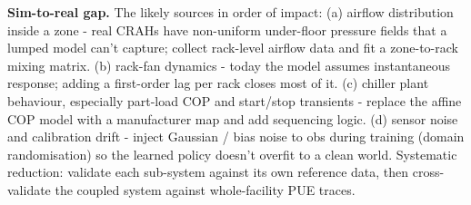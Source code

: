 \documentclass[letterpaper,11pt]{article}
\begin{document}
	\textbf{Sim-to-real gap.} The likely sources in order of impact: 
	(a) airflow distribution inside a zone - real CRAHs have non-uniform under-floor pressure fields that a lumped model can't capture; collect rack-level airflow data and fit a zone-to-rack mixing matrix. 
	(b) rack-fan dynamics - today the model assumes instantaneous response; adding a first-order lag per rack closes most of it. 
	(c) chiller plant behaviour, especially part-load COP and start/stop transients - replace the affine COP model with a manufacturer map and add sequencing logic. 
	(d) sensor noise and calibration drift - inject Gaussian / bias noise to obs during training (domain randomisation) so the learned policy doesn't overfit to a clean world. Systematic reduction: validate each sub-system against its own reference data, then cross-validate the coupled system against whole-facility PUE traces.
	
\end{document}
